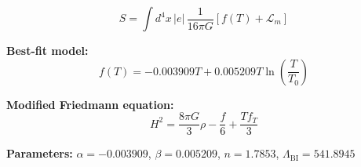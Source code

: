 
\begin{equation}
  S = \int d^4x \, |e| \, \frac{1}{16\pi G} \left[ f(T) + \mathcal{L}_m \right]
\end{equation}

\textbf{Best-fit model:}
\begin{equation}
  f(T) = -0.003909 T + 0.005209 T \ln\!\left(\frac{T}{T_0}\right)
\end{equation}

\textbf{Modified Friedmann equation:}
\begin{equation}
  H^2 = \frac{8\pi G}{3} \rho - \frac{f}{6} + \frac{T f_T}{3}
\end{equation}

\textbf{Parameters:}
$\alpha = -0.003909$, \quad
$\beta = 0.005209$, \quad
$n = 1.7853$, \quad
$\Lambda_{\text{BI}} = 541.8945$